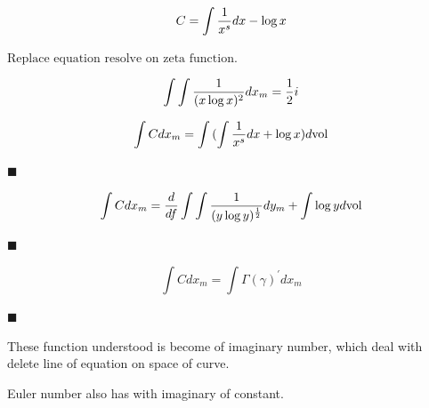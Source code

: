 \documentclass{jsarticle}
\begin{document}
\begin{equation}
	C = \int {1 \over x^s}dx - \log x 
\end{equation}

$\text{Replace equation resolve on zeta function.}$

\begin{equation}
	\int \int {1 \over (x \log x)^2}dx_{m} = {1 \over 2}i 
\end{equation}

\begin{equation}
	\int C dx_m = \int{({\int {1 \over x^s}dx}  + \log x)}d \mathrm{vol}
\end{equation}
\begin{flushright}
$\blacksquare$
\end{flushright}

\begin{equation}
	\int C dx_m = {d \over d f}\int \int {1 \over (y \log y)^{1 \over 2}}
	dy_m + \int \log y d \mathrm{vol}
\end{equation}
\begin{flushright}
$\blacksquare$
\end{flushright}

\begin{equation}
	\int C dx_m = \int \Gamma(\gamma)^{'}dx_m
\end{equation}
\begin{flushright}
$\blacksquare$
\end{flushright}

   These function understood is become of imaginary number,
  which deal with delete line of equation on space of curve.


   Euler number also has with imaginary of constant.
\end{document}
